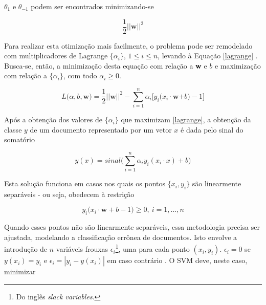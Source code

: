 \ensuremath{\theta_1} e \ensuremath{\theta_{-1}} podem ser encontrados minimizando-se 

\begin{equation}
\label{optim:svm}
\ensuremath{\frac{1}{2}||}\textbf{w}\ensuremath{||^2}
\end{equation}

Para realizar esta otimização mais facilmente, o problema pode ser remodelado com multiplicadores de Lagrange \ensuremath{\{\alpha_i\}}, \ensuremath{1 \leq i \leq n}, levando à Equação \ref{lagrange} \cite{mono-puc}. Busca-se, então, a minimização desta equação com relação a \textbf{w} e \ensuremath{b} e maximização com relação a \ensuremath{\{\alpha_i\}}, com todo \ensuremath{\alpha_i \geq 0}.

\begin{equation}
\label{lagrange}
\ensuremath{L(\alpha, b,}\textbf{w}\ensuremath{) = \frac{1}{2} ||}\textbf{w}\ensuremath{||^2 - \sum_{i = 1}^n \alpha_i\big[y_i(x_i \cdot}\textbf{w}\ensuremath{+ b) -1 \big]} %
\end{equation}

Após a obtenção dos valores de \ensuremath{\{\alpha_i\}} que maximizam \ref{lagrange}, a obtenção da classe \ensuremath{y} de um documento representado por um vetor \ensuremath{x} é dada pelo sinal do somatório

\begin{equation}
\label{result:svm}
\ensuremath{y(x) = sinal\bigg(\sum_{i = 1}^n \alpha_iy_i(x_i \cdot x) + b\bigg)} %
\end{equation}

Esta solução funciona em casos nos quais os pontos \ensuremath{\{x_i, y_i\}} são linearmente separáveis - ou seja, obedecem à restrição

\begin{equation}
\label{restr2:svm}
\ensuremath{y_i(x_i \cdot} \textbf{w} + \ensuremath{b -1) \geq 0,\ i = 1,...,n}
\end{equation}

Quando esses pontos não são linearmente separáveis, essa metodologia precisa ser ajustada, modelando a classificação errônea de documentos. Isto envolve a introdução de \ensuremath{n} variáveis frouxas \ensuremath{\epsilon_i}\footnote{Do inglês \emph{slack variables}.}, uma para cada ponto \ensuremath{(x_i, y_i)}. \ensuremath{\epsilon_i = 0} se \ensuremath{y(x_i) = y_i} e \ensuremath{\epsilon_i = |y_i - y(x_i)|} em caso contrário \cite{bishop}. O SVM deve, neste caso, minimizar

